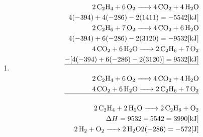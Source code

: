 \documentclass[12pt]{article}
\begin{document}
\begin{enumerate}
    \begin{enumerate}

      \item {}

        \begin{equation}
          \begin{split}
            \ce{2C2H4 + 6O2 -> 4CO2 + 4H2O}\\
            4(-394)+4(-286)-2(1411)=-5542[\si{\kilo\joule}]\\
            \ce{2C2H6 + 7O2 -> 4CO2 + 6H2O}\\
            4(-394)+6(-286)-2(3120)=-9532[\si{\kilo\joule}]\\
            \ce{4CO2 + 6H2O -> 2C2H6 + 7O2}\\
            -[4(-394)+6(-286)-2(3120)]=9532[\si{\kilo\joule}]\\
            \hline\\
            \ce{2C2H4 + 6O2 -> 4CO2 + 4H2O}\\
            \ce{4CO2 + 6H2O -> 2C2H6 + 7O2}\\
            \hline\\
            \ce{2C2H4 + 2H2O -> 2C2H6 + O2}\\
            \Delta H = 9532-5542=3990[\si{\kilo\joule}]\\
            \ce{2H2 + O2 -> 2H2O}
            2(-286)=-572[\si{\joule}]
          \end{split}
          \label{8}
        \end{equation}

    \end{enumerate}

\end{enumerate}
\end{document}
